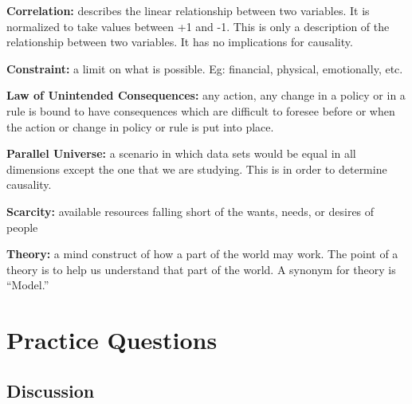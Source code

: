 \documentclass[
]{book}
\begin{document}
\textbf{Correlation:} describes the linear relationship between two variables. It is normalized to take values between +1 and -1. This is only a description of the relationship between two variables. It has no implications for causality.

\textbf{Constraint:} a limit on what is possible. Eg: financial, physical, emotionally, etc.

\textbf{Law of Unintended Consequences:} any action, any change in a policy or in a rule is bound to have consequences which are difficult to foresee before or when the action or change in policy or rule is put into place.

\textbf{Parallel Universe:} a scenario in which data sets would be equal in all dimensions except the one that we are studying. This is in order to determine causality.

\textbf{Scarcity:} available resources falling short of the wants, needs, or desires of people

\textbf{Theory:} a mind construct of how a part of the world may work. The point of a theory is to help us understand that part of the world. A synonym for theory is ``Model.''

\hypertarget{practice-questions}{%
\section{Practice Questions}\label{practice-questions}}

\hypertarget{discussion}{%
\subsection{Discussion}\label{discussion}}
\end{document}
